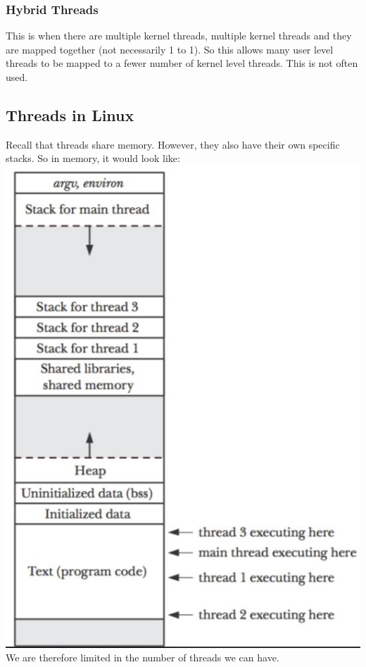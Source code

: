 \documentclass[12pt]{article}
\theoremstyle{definition}
\begin{document}
\subsubsection{Hybrid Threads}
This is when there are multiple kernel threads, multiple kernel threads and they are mapped together (not necessarily 1 to 1). So this allows many user level threads to be mapped to a fewer number of kernel level threads. This is not often used.

\subsection{Threads in Linux}
Recall that threads share memory. However, they also have their own specific stacks. So in memory, it would look like:
\\
\includegraphics{linux_threads}
\\
We are therefore limited in the number of threads we can have.
\end{document}
